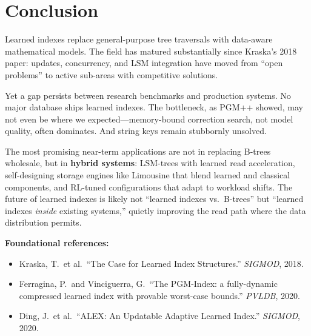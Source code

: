 \documentclass[11pt, a4paper]{article}
\begin{document}
\section{Conclusion}

Learned indexes replace general-purpose tree traversals with data-aware
mathematical models. The field has matured substantially since Kraska's
2018 paper: updates, concurrency, and LSM integration have moved from
``open problems'' to active sub-areas with competitive solutions.

Yet a gap persists between research benchmarks and production systems. No
major database ships learned indexes. The bottleneck, as PGM++ showed,
may not even be where we expected---memory-bound correction search, not
model quality, often dominates. And string keys remain stubbornly unsolved.

The most promising near-term applications are not in replacing B-trees
wholesale, but in \textbf{hybrid systems}: LSM-trees with learned read
acceleration, self-designing storage engines like Limousine that blend
learned and classical components, and RL-tuned configurations that adapt
to workload shifts. The future of learned indexes is likely not ``learned
indexes vs.\ B-trees'' but ``learned indexes \emph{inside} existing systems,''
quietly improving the read path where the data distribution permits.

\vspace{1em}
\noindent\textbf{Foundational references:}
\begin{itemize}[nosep]
    \item Kraska, T.\ et al.\ ``The Case for Learned Index Structures.''
        \emph{SIGMOD}, 2018.
    \item Ferragina, P.\ and Vinciguerra, G.\ ``The PGM-Index: a fully-dynamic
        compressed learned index with provable worst-case bounds.''
        \emph{PVLDB}, 2020.
    \item Ding, J.\ et al.\ ``ALEX: An Updatable Adaptive Learned Index.''
        \emph{SIGMOD}, 2020.
\end{itemize}
\end{document}
